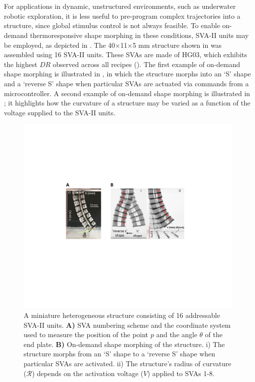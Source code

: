 \section{}
For applications in dynamic, unstructured environments, such as underwater robotic exploration, it is less useful to pre-program complex trajectories into a structure, since global stimulus control is not always feasible. To enable on-demand thermoresponsive shape morphing in these conditions, SVA-II units may be employed, as depicted in . The 40×11×5 mm structure shown in  was assembled using 16 SVA-II units. These SVAs are made of HG03, which exhibits the highest $DR$ observed across all recipes (). The first example of on-demand shape morphing is illustrated in , in which the structure morphs into an `S' shape and a `reverse S' shape when particular SVAs are actuated via commands from a microcontroller. %
A second example of on-demand shape morphing is illustrated in ; it highlights how the curvature of a structure may be varied as a function of the voltage supplied to the SVA-II units.\\


\begin{figure}[!ht]
\centering
\includegraphics[width=\textwidth]{16svaArm.pdf}
\caption[]{A miniature heterogeneous structure consisting of 16 addressable SVA-II units. \textbf{A)} SVA numbering scheme and the coordinate system used to measure the position of the point $p$ and the angle $\theta$ of the end plate. \textbf{B)} On-demand shape morphing of the structure. i) The structure morphs from an `S' shape to a `reverse S' shape when particular SVAs are activated. ii) The structure's radius of curvature ($\mathcal{R}$) depends on the activation voltage ($V$) applied to SVAs 1-8.}
\label{fig:16svaArm}
\end{figure}

